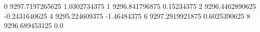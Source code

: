 0 9297.7197265625 1.0302734375
1 9296.841796875 0.15234375
2 9296.4462890625 -0.2431640625
4 9295.224609375 -1.46484375
6 9297.2919921875 0.6025390625
8 9296.689453125 0.0
